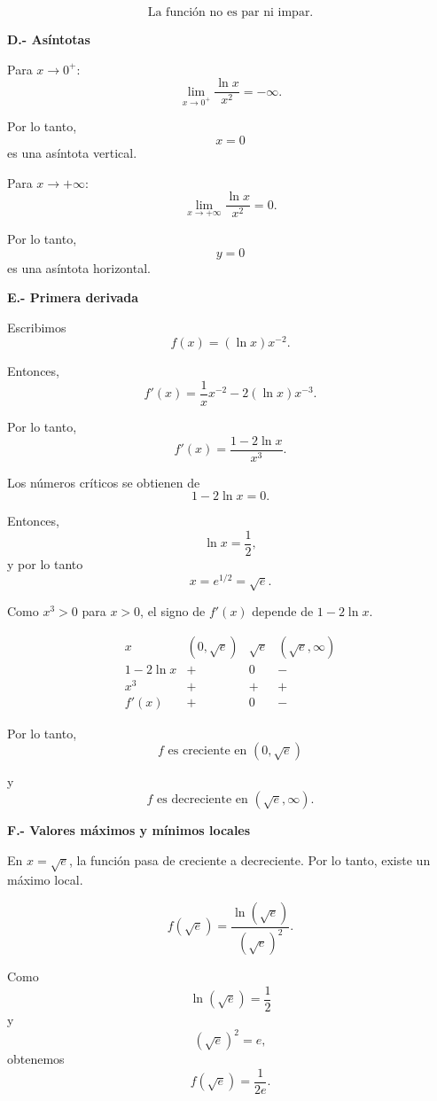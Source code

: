 \documentclass[12pt]{article}
\begin{document}
\begin{enumerate}[label=\alph*.-]
    \[
    \boxed{\text{La función no es par ni impar.}}
    \]

    \textbf{D.- Asíntotas}

    Para $x\to0^+$:
    \[
    \lim_{x\to0^+}\frac{\ln x}{x^2}=-\infty.
    \]

    Por lo tanto,
    \[
    \boxed{x=0}
    \]
    es una asíntota vertical.

    Para $x\to+\infty$:
    \[
    \lim_{x\to+\infty}\frac{\ln x}{x^2}=0.
    \]

    Por lo tanto,
    \[
    \boxed{y=0}
    \]
    es una asíntota horizontal.

    \textbf{E.- Primera derivada}

    Escribimos
    \[
    f(x)=(\ln x)x^{-2}.
    \]

    Entonces,
    \[
    f'(x)
    =
    \frac1x x^{-2}
    -2(\ln x)x^{-3}.
    \]

    Por lo tanto,
    \[
    f'(x)
    =
    \frac{1-2\ln x}{x^3}.
    \]

    Los números críticos se obtienen de
    \[
    1-2\ln x=0.
    \]

    Entonces,
    \[
    \ln x=\frac12,
    \]
    y por lo tanto
    \[
    x=e^{1/2}=\sqrt e.
    \]

    Como $x^3>0$ para $x>0$, el signo de $f'(x)$ depende de
    $1-2\ln x$.

    \[
    \begin{array}{c|ccc}
    x & (0,\sqrt e) & \sqrt e & (\sqrt e,\infty)\\
    \hline
    1-2\ln x & + & 0 & -\\
    x^3 & + & + & +\\
    \hline
    f'(x) & + & 0 & -
    \end{array}
    \]

    Por lo tanto,
    \[
    \boxed{
    f\text{ es creciente en }(0,\sqrt e)
    }
    \]

    y
    \[
    \boxed{
    f\text{ es decreciente en }(\sqrt e,\infty).
    }
    \]

    \textbf{F.- Valores máximos y mínimos locales}

    En $x=\sqrt e$, la función pasa de creciente a decreciente.
    Por lo tanto, existe un máximo local.

    \[
    f(\sqrt e)
    =
    \frac{\ln(\sqrt e)}{(\sqrt e)^2}.
    \]

    Como
    \[
    \ln(\sqrt e)=\frac12
    \]
    y
    \[
    (\sqrt e)^2=e,
    \]
    obtenemos
    \[
    f(\sqrt e)=\frac{1}{2e}.
    \]


\end{enumerate}
\end{document}
